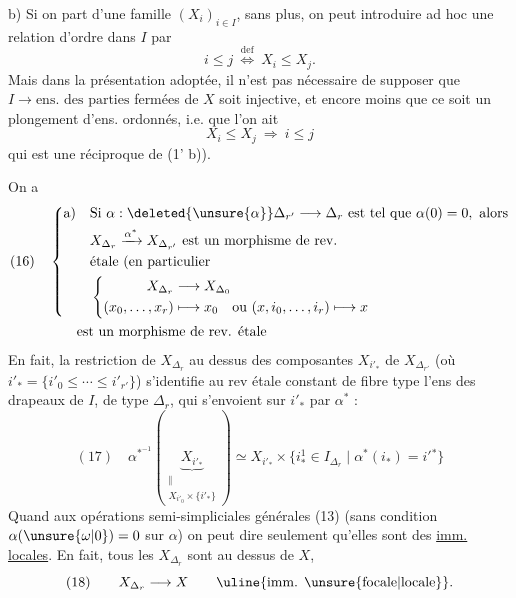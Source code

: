 b) Si on part d'une famille $(X_i)_{i\in I}$,  sans
plus, on peut introduire ad hoc une relation
d'ordre dans $I$ par 
\[
i\leq j\ \overset{\mathrm{def}}{\Longleftrightarrow}\ X_i\leq X_j.
\]
Mais dans la présentation adoptée, il n'est pas
nécessaire de supposer que  $I\longrightarrow\text{ens. des parties}$
fermées de $X$ soit injective, et encore moins
que ce soit un plongement d'ens. ordonnés,
i.e. que l'on ait
\[
X_i\leq X_j\ \Longrightarrow\ i\leq j
\]
qui est une réciproque de (1' b)).

On a
\[
\begin{aligned}
(16)\quad&
\left\{\begin{aligned}
\text{a)}\quad&\text{Si }\alpha:\deleted{\unsure{\alpha}}\Delta_{r'}\longrightarrow\Delta_r\text{ est tel que }\alpha(0)=0,\text{ alors}\\
&X_{\Delta_r}\xrightarrow{\alpha^*}X_{\Delta_{r'}}\text{ est un morphisme de rev.}\\
&\text{étale (en particulier}\\
&\left\{\begin{aligned}
X_{\Delta_r}&\longrightarrow X_{\Delta_0}\\
(x_0,\ldots,x_r)&\longmapsto x_0\quad\text{ou }(x,i_0,\ldots,i_r)\longmapsto x
\end{aligned}\right.
\end{aligned}\right.\\
&\qquad\text{est un morphisme de rev. étale}
\end{aligned}
\]
En fait, la  restriction de $X_{\Delta_r}$ au
dessus des composantes $X_{i'_*}$  de $X_{\Delta_{r'}}$
(où $i'_* = \{i'_0\leq\cdots\leq i'_{r'}\}$)  s'identifie
au rev étale constant de fibre type l'ens
des drapeaux  de $I$, de type $\Delta_r$, qui
s'envoient sur $i'_*$ par $\alpha^*$ :
\[
(17)\quad\alpha^{*^{-1}}\left(\underbrace{X_{i'_*}}_{\substack{\Vert\\X_{i'_0}\times\{i'_*\}}}\right)
\simeq X_{i'_*}\times\{i^1_*\in I_{\Delta_r}\mid\alpha^*(i_*)=i'{}^*\}
\]
Quand aux opérations semi-simpliciales
générales (13) (sans condition $\alpha(\unsure{\omega|0})=0$ sur
$\alpha$) on peut dire seulement qu'elles sont
des \uline{imm. locales}. En fait, tous les
$X_{\Delta_r}$ sont au dessus de $X$, 
\[
(18)\qquad X_{\Delta_r}\longrightarrow X\qquad\text{\uline{imm. \unsure{focale|locale}}}.
\]

